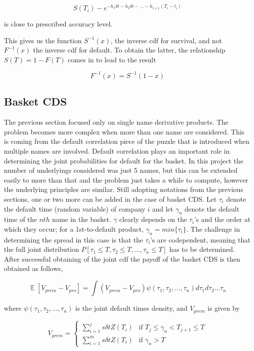 \documentclass[a4paper,12pt]{article}
\DeclareMathOperator*{\E}{\mathbb{E}}
\begin{document}
$$S(T_i) - e^{-h_1\delta t - h_2 \delta t - \dots - h_{i + 1}(T_i - t_{i})} $$

is close to prescribed accuracy level. 

This gives us the function $S^{-1}(x)$, the inverse cdf for survival, and not $F^{-1}(x)$ the inverse cdf for default. To obtain the latter, the relationship $S(T) = 1 - F(T)$ comes in to lead to the result 

\begin{equation}
F^{-1}(x) = S^{-1}(1 - x)
\end{equation}

\subsection{Basket CDS}
The previous section focused only on single name derivative products. The problem becomes more complex when more than one name are considered. This is coming from the default correlation piece of the puzzle that is introduced when multiple names are involved. Default correlation plays an important role in determining the joint probabilities for default for the basket. In this project the number of underlyings considered was just 5 names, but this can be extended easily to more than that and the problem just takes a while to compute, however the underlying principles are similar. Still adopting notations from the previous sections, one or two more can be added in the case of basket CDS. Let $\tau_i$ denote the default time (random variable) of company $i$ and let $\gamma_n$ denote the default time of the $nth$ name in the basket. $\gamma$ clearly depends on the $\tau_i$'s and the order at which they occur; for a 1st-to-default product, $\gamma_n = min\{\tau_i\}$. The challenge in determining the spread in this case is that the $\tau_i$'s are codependent, meaning that the full joint distribution $P[\tau_1 \leq T, \tau_2 \leq T, \dots, \tau_n \leq T]$ has to be determined. After successful obtaining of the joint cdf the payoff of the basket CDS is then obtained as follows,

\begin{equation}
\E[V_{prem} - V_{pro}] = \int\left(V_{prem} - V_{pro}\right)\psi (\tau_1, \tau_2, \dots, \tau_n)d\tau_1d\tau_2\dots\tau_n
\end{equation}

where $\psi (\tau_1, \tau_2, \dots, \tau_n)$ is the joint default times density, and $V_{prem}$ is given by 

\begin{equation}
V_{prem} = 
\begin{cases} 
\sum\limits_{i = 1}^{j}s\delta t Z(T_i) & \text{if } T_j \leq \gamma_n < T_{j + 1} \leq T \\
\sum\limits_{i = 1}^{m}s\delta t Z(T_i) &  \text{if } \gamma_n > T
\end{cases}
\end{equation}
\end{document}
